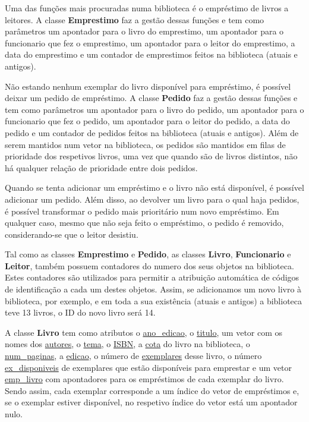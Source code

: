 \documentclass[12pt,a4paper,reqno]{report}
\numberwithin{figure}{section}
\numberwithin{equation}{section}
\begin{document}
Uma das funções mais procuradas numa biblioteca é o empréstimo de livros a leitores. A classe \textbf{Emprestimo} faz a gestão dessas funções e tem como parâmetros um apontador para o livro do emprestimo, um apontador para o funcionario que fez o emprestimo, um apontador para o leitor do emprestimo, a data do emprestimo e um contador de emprestimos feitos na biblioteca (atuais e antigos).

Não estando nenhum exemplar do livro disponível para empréstimo, é possível deixar um pedido de empréstimo. A classe \textbf{Pedido} faz a gestão dessas funções e tem como parâmetros um apontador para o livro do pedido, um apontador para o funcionario que fez o pedido, um apontador para o leitor do pedido, a data do pedido e um contador de pedidos feitos na biblioteca (atuais e antigos). Além de serem mantidos num vetor na biblioteca, os pedidos são mantidos em filas de prioridade dos respetivos livros, uma vez que quando são de livros distintos, não há qualquer relação de prioridade entre dois pedidos.

Quando se tenta adicionar um empréstimo e o livro não está disponível, é possível adicionar um pedido. Além disso, ao devolver um livro para o qual haja pedidos, é possível transformar o pedido mais prioritário num novo empréstimo. Em qualquer caso, mesmo que não seja feito o empréstimo, o pedido é removido, considerando-se que o leitor desistiu. 

Tal como as classes \textbf{Emprestimo} e \textbf{Pedido}, as classes \textbf{Livro}, \textbf{Funcionario} e \textbf{Leitor}, também possuem contadores do numero dos seus objetos na biblioteca. Estes contadores são utilizados para permitir a atribuição automática de códigos de identificação a cada um destes objetos. Assim, se adicionamos um novo livro à biblioteca, por exemplo, e em toda a sua existência (atuais e antigos) a biblioteca teve 13 livros, o ID do novo livro será 14.

A classe \textbf{Livro} tem como atributos o \underline{ano\_edicao}, o \underline{titulo}, um vetor com os nomes dos \underline{autores}, o \underline{tema}, o \underline{ISBN}, a \underline{cota} do livro na biblioteca, o \underline{num\_paginas}, a \underline{edicao}, o número de \underline{exemplares} desse livro, o número \underline{ex\_disponiveis} de exemplares que estão disponíveis para emprestar e um vetor \underline{emp\_livro} com apontadores para os empréstimos de cada exemplar do livro. Sendo assim, cada exemplar corresponde a um índice do vetor de empréstimos e, se o exemplar estiver disponível, no respetivo índice do vetor está um apontador nulo.
\end{document}
